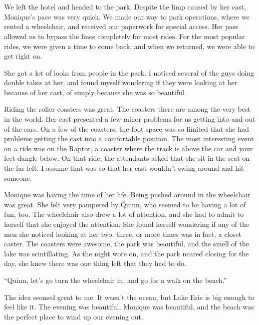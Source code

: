 \chapter{~}
We left the hotel and headed to the park. Despite the limp caused by her cast, Monique's
pace was very quick. We made our way to park operations, where we rented a wheelchair, and
received our paperwork for special access. Her pass allowed us to bypass the lines completely
for most rides. For the most popular rides, we were given a time to come back, and when we
returned, we were able to get right on.

She got a lot of looks from people in the park. I noticed several of the guys doing double
takes at her, and found myself wondering if they were looking at her because of her cast, of
simply because she was so beautiful.

Riding the roller coasters was great. The coasters there are among the very best in the
world. Her cast presented a few minor problems for us getting into and out of the cars. On a few
of the coasters, the foot space was so limited that she had problems getting the cast into a
comfortable position. The most interesting event on a ride was on the Raptor, a coaster where
the track is above the car and your feet dangle below. On that ride, the attendants asked that
she sit in the seat on the far left. I assume that was so that her cast wouldn't swing around
and hit someone.

\begin{thought}
Monique was having the time of her life. Being pushed around in the wheelchair was great.
She felt very pampered by Quinn, who seemed to be having a lot of fun, too. The wheelchair also
drew a lot of attention, and she had to admit to herself that she enjoyed the attention. She
found herself wondering if any of the men she noticed looking at her two, three, or more times
was in fact, a closet caster. The coasters were awesome, the park was beautiful, and the smell
of the lake was scintillating. As the night wore on, and the park neared closing for the day,
she knew there was one thing left that they had to do.
\end{thought}

``Quinn, let's go turn the wheelchair in, and go for a walk on the beach.''

The idea seemed great to me. It wasn't the ocean, but Lake Erie is big enough to feel like
it. The evening was beautiful, Monique was beautiful, and the beach was the perfect place to
wind up our evening out.

